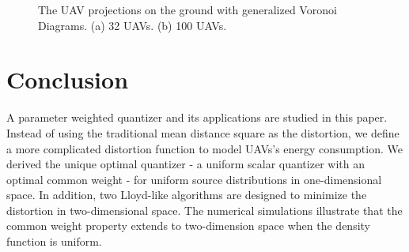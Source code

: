 \documentclass[smallabstract,smallcaptions]{dccpaper}
\begin{document}
\begin{figure}[t]
\centering
{}
\hfil
{}
\captionsetup{justification=justified}
\caption{\small{The UAV projections on the ground with generalized Voronoi Diagrams. 
(a) 32 UAVs. (b) 100 UAVs.}}
\label{Distortion_region}
\vspace{-4ex}
\end{figure}

\section{Conclusion}
%
A parameter weighted quantizer and its applications are studied in this paper. Instead of using the traditional mean
distance square as the distortion, we define a more complicated distortion function to model UAVs's energy consumption.
We derived the unique optimal quantizer - a uniform scalar quantizer with an optimal common weight - for uniform source
distributions in one-dimensional space.  In addition, two Lloyd-like algorithms are designed to minimize the distortion in
two-dimensional space.  The numerical simulations illustrate that the common weight property extends to two-dimension
space when the density function is uniform.
\end{document}
